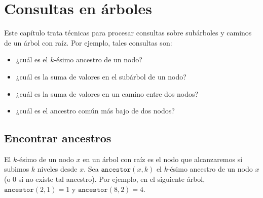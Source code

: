 \chapter{Consultas en árboles}


Este capítulo trata técnicas para
procesar consultas sobre
subárboles y caminos de un árbol con raíz.
Por ejemplo, tales consultas son:

\begin{itemize}
\item ¿cuál es el $k$-ésimo ancestro de un nodo?
\item ¿cuál es la suma de valores en el subárbol de un nodo?
\item ¿cuál es la suma de valores en un camino entre dos nodos?
\item ¿cuál es el ancestro común más bajo de dos nodos?
\end{itemize}

\section{Encontrar ancestros}


El $k$-ésimo  de un nodo $x$ en un árbol con raíz
es el nodo que alcanzaremos si subimos $k$
niveles desde $x$.
Sea $\texttt{ancestor}(x,k)$ el $k$-ésimo ancestro de un nodo $x$
(o $0$ si no existe tal ancestro).
Por ejemplo, en el siguiente árbol,
$\texttt{ancestor}(2,1)=1$ y $\texttt{ancestor}(8,2)=4$.
\begin{center}
\end{center}

